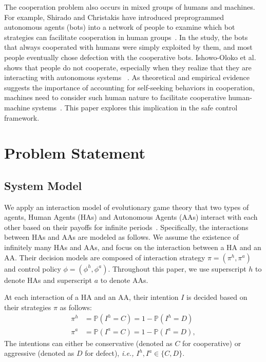 \documentclass[letterpaper]{article} %
\newcommand{\ie}{\textit{i.e., }}
\begin{document}
The cooperation problem also occurs in mixed groups of humans and machines. For example, Shirado and Christakis have introduced preprogrammed autonomous agents (bots) into a network of people to examine which bot strategies can facilitate cooperation in human groups~\cite{Shirado2020-hs}. In the study, the bots that always cooperated with humans were simply exploited by them, and most people eventually chose defection with the cooperative bots. Ishowo-Oloko et al. shows that people do not cooperate, especially when they realize that they are interacting with autonomous systems ~\cite{Ishowo-Oloko2019-vn}. As theoretical and empirical evidence suggests the importance of accounting for self-seeking behaviors in cooperation, machines need to consider such human nature to facilitate cooperative human-machine systems~\cite{Paiva2018-iu, Dafoe2021-cw,Rahwan2019-rk}. This paper explores this implication in the safe control framework.


\section{Problem Statement}
\label{sec:ps}
\subsection{System Model}
We apply an interaction model of evolutionary game theory that two types of agents, Human Agents (HAs) and Autonomous Agents (AAs) interact with each other based on their payoffs for infinite periods~\cite{Hofbauer1998-jg, Nowak2006-bl}. Specifically, the interactions between HAs and AAs are modeled as follows. We assume the existence of infinitely many HAs and AAs, and focus on the interaction between a HA and an AA.  Their decision models are composed of interaction strategy $\pi=(\pi^h,\pi^a)$ and control policy $\phi = (\phi^h, \phi^a)$.  Throughout this paper, we use superscript $h$ to denote HAs and superscript $a$ to denote AAs.

At each interaction of a HA and an AA, their intention $I$ is decided based on their strategies $\pi$ as follows:
\begin{align}
\label{eq:strategy}
    \pi^h &= \mathbb{P}(I^h=C)=1-\mathbb{P}(I^h=D) \\
    \pi^a &= \mathbb{P}(I^a=C)=1-\mathbb{P}(I^a=D),
\end{align}
The intentions can either be conservative (denoted as $C$ for cooperative) or aggressive (denoted as $D$ for defect), \ie $I^h, I^a \in \{C,D\}$.
\end{document}
